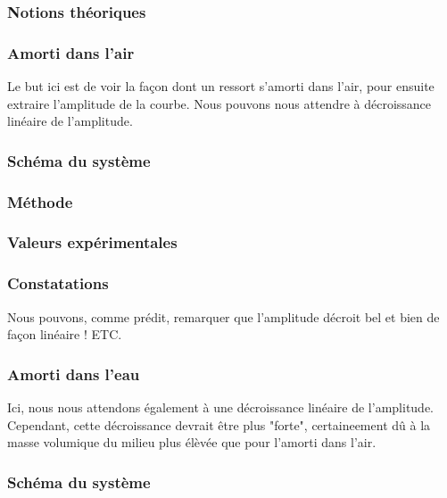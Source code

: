             \subsubsection{Notions théoriques}
            \subsubsection{Amorti dans l'air}
                Le but ici est de voir la façon dont un ressort s'amorti dans l'air, pour ensuite extraire l'amplitude de la courbe.
                Nous pouvons nous attendre à décroissance linéaire de l'amplitude.
    
            \subsubsection{Schéma du système}
    
            \subsubsection{Méthode}
    
            \subsubsection{Valeurs expérimentales}
    
            \subsubsection{Constatations}
                Nous pouvons, comme prédit, remarquer que l'amplitude décroit bel et bien de façon linéaire ! ETC.
    
            \subsubsection{Amorti dans l'eau}
                Ici, nous nous attendons également à une décroissance linéaire de l'amplitude.
                Cependant, cette décroissance devrait être plus "forte", certaineement dû à la masse volumique du milieu plus élèvée que pour l'amorti dans l'air.
                
            \subsubsection{Schéma du système}
    
